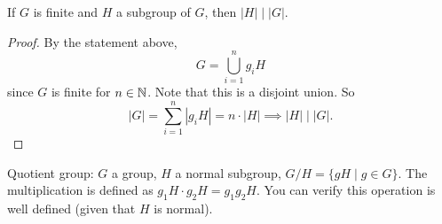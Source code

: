 \begin{prop}
If $G$ is finite and $H$ a subgroup of $G$, then $|H| \mid |G|$.
\end{prop}


\begin{proof}
    By the statement above,
    \[
    G = \bigcup_{i=1}^{n}g_iH
    \]
    since $G$ is finite for $n \in \mathbb{N}$. Note that this is a disjoint union. So \[
        |G|= \sum_{i=1}^{n} |g_iH| = n \cdot |H| \implies |H| \mid |G|.
    \]
\end{proof}
Quotient group: $G$ a group, $H$ a normal subgroup, $G/H = \{ gH \mid g \in G \}$. The multiplication is defined as $g_1H \cdot g_2H = g_1g_2H$. You can verify this operation is well defined (given that $H$ is normal).


